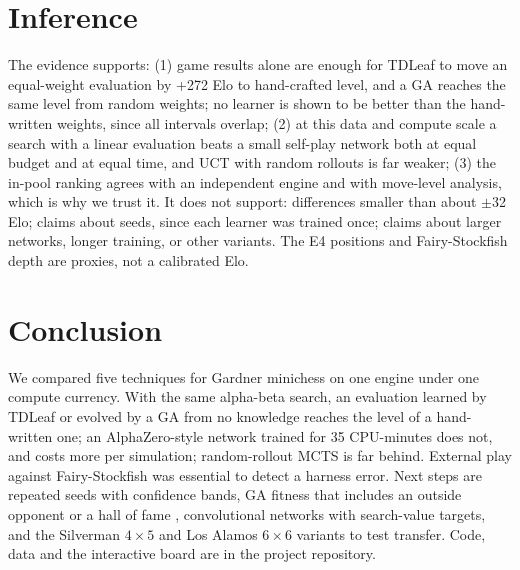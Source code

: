 \section{Inference}
The evidence supports: (1) game results alone are enough for TDLeaf to move an equal-weight evaluation by +272 Elo to hand-crafted level, and a GA reaches the same level from random weights; no learner is shown to be better than the hand-written weights, since all intervals overlap; (2) at this data and compute scale a search with a linear evaluation beats a small self-play network both at equal budget and at equal time, and UCT with random rollouts is far weaker; (3) the in-pool ranking agrees with an independent engine and with move-level analysis, which is why we trust it. It does not support: differences smaller than about $\pm$32 Elo; claims about seeds, since each learner was trained once; claims about larger networks, longer training, or other variants. The E4 positions and Fairy-Stockfish depth are proxies, not a calibrated Elo.

\section{Conclusion}
We compared five techniques for Gardner minichess on one engine under one compute currency. With the same alpha-beta search, an evaluation learned by TDLeaf or evolved by a GA from no knowledge reaches the level of a hand-written one; an AlphaZero-style network trained for 35 CPU-minutes does not, and costs more per simulation; random-rollout MCTS is far behind. External play against Fairy-Stockfish was essential to detect a harness error. Next steps are repeated seeds with confidence bands, GA fitness that includes an outside opponent or a hall of fame \cite{rosin1997}, convolutional networks with search-value targets, and the Silverman $4\times5$ and Los Alamos $6\times6$ variants to test transfer. Code, data and the interactive board are in the project repository.

